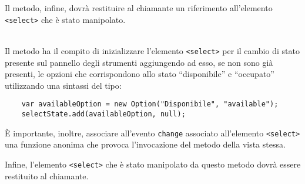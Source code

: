 \begin{description}
  Il metodo, infine, dovrà restituire al chiamante un riferimento all'elemento \verb'<select>' che è stato manipolato.
  
  \item{}\\
  Il metodo ha il compito di inizializzare l'elemento \verb'<select>' per il cambio di stato presente sul pannello degli strumenti aggiungendo ad esso, se non sono già presenti, le opzioni che corrispondono allo stato ``disponibile'' e ``occupato'' utilizzando una sintassi del tipo:
  \begin{verbatim}
    var availableOption = new Option("Disponibile", "available");
    selectState.add(availableOption, null);
  \end{verbatim}
  
  È importante, inoltre, associare all'evento \verb'change' associato all'elemento \verb'<select>' una funzione anonima che provoca l'invocazione del metodo  della vista stessa.
  
  Infine, l'elemento \verb'<select>' che è stato manipolato da questo metodo dovrà essere restituito al chiamante.

\end{description}

